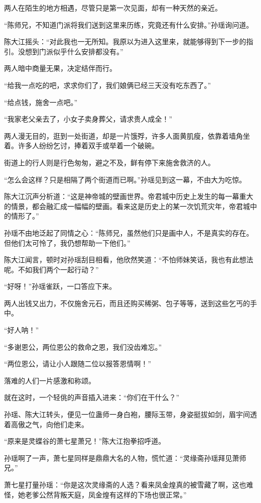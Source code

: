 \begin{this_body}
两人在陌生的地方相遇，尽管只是第一次见面，却有一种天然的亲近。

“陈师兄，不知道门派将我们送到这里来历练，究竟还有什么安排。”孙瑶询问道。

陈大江摇头：“对此我也一无所知。我原以为进入这里来，就能够得到下一步的指引。没想到门派似乎什么安排都没有。”

两人暗中商量无果，决定结伴而行。

“给我一点吃的吧，求求你们了，我们娘俩已经三天没有吃东西了。”

“给点钱，施舍一点吧。”

“我家老父亲去了，小女子卖身葬父，请求贵人成全！”

两人漫无目的，逛到一处街道，却是一片饿殍，许多人面黄肌瘦，依靠着墙角坐着。许多人纷纷乞讨，捧着双手或举着一个破碗。

街道上的行人则是行色匆匆，避之不及，鲜有停下来施舍救济的人。

“怎么会这样？只是相隔了两个街道而已啊。”孙瑶见到这一幕，不由大为吃惊。

陈大江沉声分析道：“这是神帝城的壁画世界。帝君城中历史上发生的每一幕重大的情景，都会融汇成一幅幅的壁画。看来这是历史上的某一次饥荒灾年，帝君城中的情形了。”

孙瑶不由地泛起了同情之心：“陈师兄，虽然他们只是画中人，不是真实的存在。但他们太可怜了，我仍想帮助一下他们。”

陈大江闻言，顿时对孙瑶刮目相看，他欣然笑道：“不怕师妹笑话，我也有此想法呢。不如我们两个一起行动？”

“好呀！”孙瑶雀跃，一口答应下来。

两人出钱又出力，不仅施舍元石，而且还购买稀粥、包子等等，送到这些乞丐的手中。

“好人呐！”

“多谢恩公，两位恩公的救命之恩，我们没齿难忘。”

“两位恩公，请让小人跟随二位以报答恩情啊！”

落难的人们一片感激和称颂。

就在这时，一个轻佻的声音插入进来：“你们在干什么？”

孙瑶、陈大江转头，便见一位蛊师一身白袍，腰际玉带，身姿挺拔如剑，眉宇间透着高傲之气，向他们走来。

“原来是灵蝶谷的萧七星萧兄！”陈大江抱拳招呼道。

孙瑶啊了一声，萧七星同样是鼎鼎大名的人物，慌忙道：“灵缘斋孙瑶拜见萧师兄。”

萧七星打量孙瑶：“你是这次灵缘斋的人选？看来凤金煌真的被雪藏了啊，这也难怪，她老爹公然背叛天庭，凤金煌有这样的下场也很正常。”


\end{this_body}
